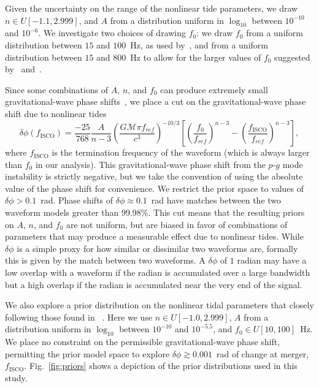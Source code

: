 Given the uncertainty on the range of the nonlinear tide parameters, we draw $n \in U[-1.1, 2.999]$, and $A$ from a distribution uniform in $\log_{10}$ between $10^{-10}$ and $10^{-6}$. We investigate two choices of drawing $f_0$: we draw $f_0$ from a uniform distribution between $15$ and $100$~Hz, as used by~\cite{Essick:2016tkn}, and from a uniform distribution between $15$ and $800$~Hz to allow for the larger values of $f_0$ suggested by~\cite{Zhou:2018tvc} and~\cite{Andersson:2017iav}.

Since some combinations of $A$, $n$, and $f_0$ can produce extremely small gravitational-wave phase shifts~\citep{Essick:2016tkn}, we place a cut on the gravitational-wave phase shift due to nonlinear tides
\begin{equation}
\delta \phi(f_\mathrm{ISCO}) =
                      \frac{-25}{768}  \frac{A}{n-3} \left( \frac{G \mathcal{M} \pi f_{ref}}{c^3} \right)^{-10/3} \left[ \left( \frac{f_0}{f_{ref}} \right)^{n-3} - \left(\frac{f_\mathrm{ISCO}}{f_{ref}} \right)^{n-3} \right],
\end{equation}
where $f_\mathrm{ISCO}$ is the termination frequency of the waveform (which is always larger than $f_0$ in our analysis). This gravitational-wave phase shift from the $p$-$g$ mode instability is strictly negative, but we take the convention of using the absolute value of the phase shift for convenience. We restrict the prior space to values of $\delta \phi > 0.1$~rad. Phase shifts of $\delta \phi \approx 0.1$~rad have matches between the two waveform models greater than 99.98\%. This cut means that the resulting priors on $A$, $n$, and $f_0$ are not uniform, but are biased in favor of combinations of parameters that may produce a measurable effect due to nonlinear tides. While $\delta \phi$ is a simple proxy for how similar or dissimilar two waveforms are, formally this is given by the match between two waveforms. A $\delta \phi$ of $1$ radian may have a low overlap with a waveform if the radian is accumulated over a large bandwidth but a high overlap if the radian is accumulated near the very end of the signal.

We also explore a prior distribution on the nonlinear tidal parameters that closely following those found in ~\cite{abbott2019constraining}. Here we use $n \in U[-1.0, 2.999]$, $A$ from a distribution uniform in $\log_{10}$ between $10^{-10}$ and $10^{-5.5}$, and $f_0 \in U[10, 100]$~Hz. We place no constraint on the permissible gravitational-wave phase shift, permitting the prior model space to explore $\delta \phi \gtrsim 0.001$~rad of change at merger,  $f_\mathrm{ISCO}$. Fig.~\ref{fig:priors} shows a depiction of the prior distributions used in this study.

